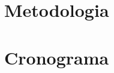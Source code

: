 \documentclass[10pt, a4paper, draftcls, conference, onecolumn]{IEEEtran}
\begin{document}

\section{Metodologia}

\section{Cronograma}

\begin{thebibliography}{00}
\end{thebibliography}
\end{document}
